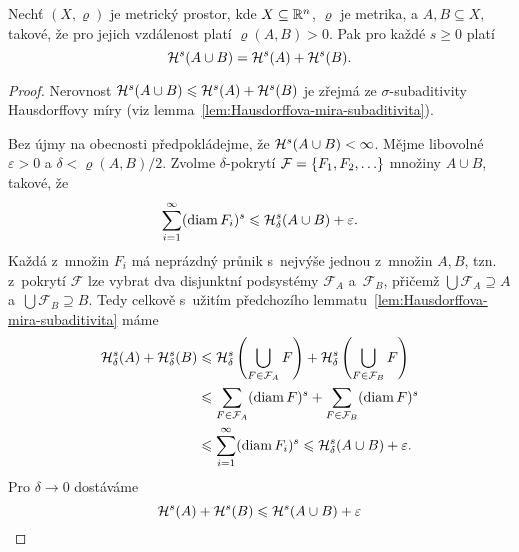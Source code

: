 \begin{lemma}\label{lem:hausdorffova-mira-sigma-aditivita-kladna-vzdalenost}
    Nechť $(X,\varrho)$ je metrický prostor, kde $X\subseteq\mathbb{R}^n$, $\varrho$ je metrika, a $A,B\subseteq X$, takové, že pro jejich vzdálenost platí $\varrho(A,B)>0$. Pak pro každé $s\geqslant 0$ platí
    \[\mathcal{H}^{s}(A\cup B)=\mathcal{H}^{s}(A)+\mathcal{H}^{s}(B).\]
\end{lemma}
\begin{proof}
    Nerovnost $\mathcal{H}^{s}(A\cup B)\leqslant\mathcal{H}^{s}(A)+\mathcal{H}^{s}(B)$ je zřejmá ze $\sigma$-subaditivity Hausdorffovy míry (viz lemma~\ref{lem:Hausdorffova-mira-subaditivita}).

    Bez újmy na obecnosti předpokládejme, že $\mathcal{H}^{s}(A\cup B)<\infty$. Mějme libovolné $\varepsilon>0$ a $\delta<\varrho(A,B)/2$. Zvolme $\delta$-pokrytí $\mathcal{F}=\left\{F_1,F_2,\ldots\right\}$ množiny $A\cup B$, takové, že
    \[\sum_{i=1}^{\infty}(\operatorname{diam}{F_i})^s\leqslant\mathcal{H}_{\delta}^{s}(A\cup B)+\varepsilon.\]
    Každá z~množin $F_i$ má neprázdný průnik s~nejvýše jednou z~množin $A,B$, tzn. z~pokrytí $\mathcal{F}$ lze vybrat dva disjunktní podsystémy $\mathcal{F}_A$ a~$\mathcal{F}_B$, přičemž $\bigcup\mathcal{F}_A\supseteq A$ a~$\bigcup\mathcal{F}_B\supseteq B$. Tedy celkově s~užitím předchozího lemmatu~\ref{lem:Hausdorffova-mira-subaditivita} máme
    \begin{align*}
        \mathcal{H}_{\delta}^{s}(A)+\mathcal{H}_{\delta}^{s}(B)&\leqslant\mathcal{H}_{\delta}^{s}\left(\bigcup_{F\in\mathcal{F}_A}F\right)+\mathcal{H}_{\delta}^{s}\left(\bigcup_{F\in\mathcal{F}_B}F\right)\\
        &\leqslant\sum_{F\in\mathcal{F}_A}(\operatorname{diam}{F})^s+\sum_{F\in\mathcal{F}_B}(\operatorname{diam}{F})^s\\
        &\leqslant\sum_{i=1}^{\infty}(\operatorname{diam}{F_i})^s\leqslant\mathcal{H}_{\delta}^{s}(A\cup B)+\varepsilon.
    \end{align*}
    Pro $\delta\to 0$ dostáváme
    \[\mathcal{H}^{s}(A)+\mathcal{H}^{s}(B)\leqslant\mathcal{H}^{s}(A\cup B)+\varepsilon\]
\end{proof}

